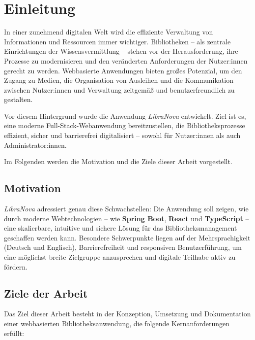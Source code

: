 \chapter{Einleitung}

In einer zunehmend digitalen Welt wird die effiziente Verwaltung von Informationen und Ressourcen immer wichtiger. Bibliotheken – als zentrale Einrichtungen der Wissensvermittlung – stehen vor der Herausforderung, ihre Prozesse zu modernisieren und den veränderten Anforderungen der Nutzer:innen gerecht zu werden. Webbasierte Anwendungen bieten großes Potenzial, um den Zugang zu Medien, die Organisation von Ausleihen und die Kommunikation zwischen Nutzer:innen und Verwaltung zeitgemäß und benutzerfreundlich zu gestalten. 

\noindent Vor diesem Hintergrund wurde die Anwendung \textit{LibraNova} entwickelt. Ziel ist es, eine moderne Full-Stack-Webanwendung bereitzustellen, die Bibliotheksprozesse effizient, sicher und barrierefrei digitalisiert – sowohl für Nutzer:innen als auch Administrator:innen. 

\noindent Im Folgenden werden die Motivation und die Ziele dieser Arbeit vorgestellt.


\section{Motivation}

\textit{LibraNova} adressiert genau diese Schwachstellen: Die Anwendung soll zeigen, wie durch moderne Webtechnologien – wie \textbf{Spring Boot}, \textbf{React} und \textbf{TypeScript} – eine skalierbare, intuitive und sichere Lösung für das Bibliotheksmanagement geschaffen werden kann. Besondere Schwerpunkte liegen auf der Mehrsprachigkeit (Deutsch und Englisch), Barrierefreiheit und responsiven Benutzerführung, um eine möglichst breite Zielgruppe anzusprechen und digitale Teilhabe aktiv zu fördern.


\section{Ziele der Arbeit}

Das Ziel dieser Arbeit besteht in der Konzeption, Umsetzung und Dokumentation einer webbasierten Bibliotheksanwendung, die folgende Kernanforderungen erfüllt:

